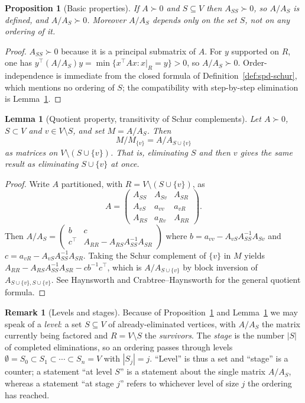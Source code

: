 \documentclass[11pt]{article}
\theoremstyle{plain}
\newtheorem{lemma}[theorem]{Lemma}
\newtheorem{proposition}[theorem]{Proposition}
\theoremstyle{definition}
\newtheorem{remark}[theorem]{Remark}
\begin{document}
\begin{humanblock}
\begin{proposition}[Basic properties]\label{prop:schur-basic}
If $A\succ0$ and $S\subseteq V$ then $A_{SS}\succ0$, so $A/A_S$ is defined, and $A/A_S\succ0$.
Moreover $A/A_S$ depends only on the \emph{set} $S$, not on any ordering of it.
\end{proposition}
\begin{proof}
$A_{SS}\succ0$ because it is a principal submatrix of $A$. For $y$ supported on $R$, one has
$y^\top(A/A_S)y=\min\{x^\top Ax : x|_R=y\}>0$, so $A/A_S\succ0$. Order-independence is immediate from
the closed formula of Definition~\ref{def:spd-schur}, which mentions no ordering of $S$; the
compatibility with step-by-step elimination is Lemma~\ref{lem:quotient}.
\end{proof}

\begin{lemma}[Quotient property, transitivity of Schur complements]\label{lem:quotient}
Let $A\succ0$, $S\subset V$ and $v\in V\setminus S$, and set $M=A/A_S$. Then
\[
M/M_{\{v\}} = A/A_{S\cup\{v\}}
\]
as matrices on $V\setminus(S\cup\{v\})$. That is, eliminating $S$ and then $v$ gives the same result
as eliminating $S\cup\{v\}$ at once.
\end{lemma}
\begin{proof}
Write $A$ partitioned, with $R=V\setminus(S\cup\{v\})$, as
\[
A=\begin{pmatrix}A_{SS}&A_{Sv}&A_{SR}\\A_{vS}&a_{vv}&a_{vR}\\A_{RS}&a_{Rv}&A_{RR}\end{pmatrix}.
\]
Then $A/A_S=\begin{pmatrix}b&c\\c^\top&A_{RR}-A_{RS}A_{SS}^{-1}A_{SR}\end{pmatrix}$ where
$b=a_{vv}-A_{vS}A_{SS}^{-1}A_{Sv}$ and $c=a_{vR}-A_{vS}A_{SS}^{-1}A_{SR}$. Taking the Schur
complement of $\{v\}$ in $M$ yields $A_{RR}-A_{RS}A_{SS}^{-1}A_{SR}-cb^{-1}c^\top$, which is
$A/A_{S\cup\{v\}}$ by block inversion of $A_{S\cup\{v\},S\cup\{v\}}$. See Haynsworth
\cite{Haynsworth} and Crabtree--Haynsworth \cite{Crabtree} for the general quotient formula.
\end{proof}

\begin{remark}[Levels and stages]\label{rem:level-stage}
Because of Proposition~\ref{prop:schur-basic} and Lemma~\ref{lem:quotient} we may speak of a
\emph{level}: a set $S\subseteq V$ of already-eliminated vertices, with $A/A_S$ the matrix currently
being factored and $R=V\setminus S$ the \emph{survivors}. The \emph{stage} is the number $|S|$ of
completed eliminations, so an ordering passes through levels
$\emptyset=S_0\subset S_1\subset\cdots\subset S_n=V$ with $|S_j|=j$. ``Level'' is thus a set and
``stage'' is a counter; a statement ``at level $S$'' is a statement about the single matrix $A/A_S$,
whereas a statement ``at stage $j$'' refers to whichever level of size $j$ the ordering has reached.
\end{remark}


\end{humanblock}
\end{document}
